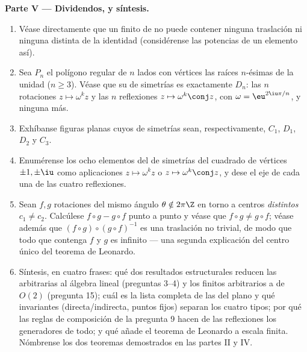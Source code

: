 \begin{problem}
\medskip
\noindent\textbf{Parte V --- Dividendos, y síntesis.}
\begin{enumerate}[resume]
  \item Véase directamente que un  finito de  no
        puede contener ninguna traslación ni ninguna
         distinta de la identidad (considérense
        las potencias de un elemento así).
  \item Sea $P_n$ el polígono regular de $n$ lados con vértices las
        raíces $n$-ésimas de la unidad ($n \geq 3$). Véase que su
         de simetrías es exactamente $D_n$: las $n$ rotaciones
        $z \mapsto \omega^k z$ y las $n$ reflexiones
        $z \mapsto \omega^k \conj z$, con
        $\omega = \eu^{2\iu\pi/n}$, y ninguna más.
  \item Exhíbanse figuras planas cuyos  de simetrías sean,
        respectivamente, $C_1$, $D_1$, $D_2$ y $C_3$.
  \item Enumérense los ocho elementos del  de simetrías del
        cuadrado de vértices $\pm1, \pm\iu$ como aplicaciones
        $z \mapsto \omega^k z$ o $z \mapsto \omega^k\conj z$, y dese
        el eje de cada una de las cuatro reflexiones.
  \item Sean $f, g$ rotaciones del mismo ángulo
        $\theta \notin 2\pi\Z$ en torno a centros \emph{distintos}
        $c_1 \neq c_2$. Calcúlese $f\circ g - g\circ f$ punto a
        punto y véase que $f\circ g \neq g\circ f$; véase además que
        $(f \circ g)\circ(g\circ f)^{-1}$ es una traslación no
        trivial, de modo que todo  que contenga $f$ y $g$ es
        infinito --- una segunda explicación del centro único del
        teorema de Leonardo.
  \item Síntesis, en cuatro frases: qué dos resultados
        estructurales reducen las  arbitrarias al álgebra
        lineal (preguntas 3--4) y los  finitos arbitrarios a
         de $O(2)$ (pregunta 15); cuál es la lista
        completa de las  del plano y qué invariantes
        (directa/indirecta, puntos fijos) separan los cuatro tipos;
        por qué las reglas de composición de la pregunta 9 hacen de
        las reflexiones los generadores de todo; y qué añade el
        teorema de Leonardo a escala finita. Nómbrense los dos
        teoremas demostrados en las partes II y IV.
\end{enumerate}
\end{problem}
